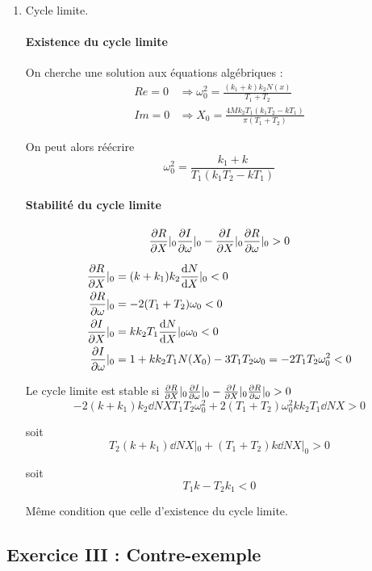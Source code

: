 \documentclass{../../td}{subfiles}
\begin{document}
\begin{enumerate}
\item Cycle limite.\\

\paragraph{Existence du cycle limite} On cherche une solution aux équations algébriques :
\begin{align*}
Re=0 & \Rightarrow \omega_0^2 = \frac{(k_1+k)k_2N(x)}{T_1+T_2} \\
Im=0 & \Rightarrow X_0 = \frac{4Mk_2T_1(k_1T_2-kT_1)}{\pi(T_1+T_2)}
\end{align*}

On peut alors réécrire \[\omega_0^2 = \frac{k_1+k}{T_1(k_1T_2-kT_1)} \]

\paragraph{Stabilité du cycle limite}
\[ \derivp[R]{X}|_0 \derivp[I]{\omega}|_0 - \derivp[I]{X}|_0 \derivp[R]{\omega}|_0 > 0 \]

\begin{align*}
\derivp[R]{X}|_0 & = (k+k_1)k_2 \dd{N}{X}|_0 < 0 \\
\derivp[R]{\omega}|_0 & = -2(T_1+T_2)\omega_0 < 0 \\
\derivp[I]{X}|_0 & = kk_2T_1 \dd{N}{X}|_0 \omega_0< 0 \\
\derivp[I]{\omega}|_0 & = 1 + kk_2T_1N(X_0)-3T_1T_2\omega_0 = -2T_1T_2\omega_0^2 < 0
\end{align*}

Le cycle limite est stable si $\derivp[R]{X}|_0 \derivp[I]{\omega}|_0 - \derivp[I]{X}|_0 \derivp[R]{\omega}|_0 > 0$
\[-2(k+k_1)k_2\dd{N}{X}T_1T_2\omega_0^2 + 2(T_1+T_2)\omega_0^2kk_2T_1\dd{N}{X}> 0\]

soit
\[T_2(k+k_1)\dd{N}{X}|_0 + (T_1+T_2)k\dd{N}{X}|_0 > 0\]

soit \[T_1k-T_2k_1<0\]

Même condition que celle d'existence du cycle limite.

\end{enumerate}


\subsection*{Exercice III : Contre-exemple}
\end{document}
